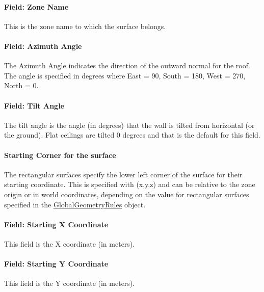 \paragraph{Field: Zone Name}\label{field-zone-name-5-005}

This is the zone name to which the surface belongs.

\paragraph{Field: Azimuth Angle}\label{field-azimuth-angle-5}

The Azimuth Angle indicates the direction of the outward normal for the roof. The angle is specified in degrees where East = 90, South = 180, West = 270, North = 0.

\paragraph{Field: Tilt Angle}\label{field-tilt-angle-5}

The tilt angle is the angle (in degrees) that the wall is tilted from horizontal (or the ground). Flat ceilings are tilted 0 degrees and that is the default for this field.

\paragraph{Starting Corner for the surface}\label{starting-corner-for-the-surface-5}

The rectangular surfaces specify the lower left corner of the surface for their starting coordinate. This is specified with (x,y,z) and can be relative to the zone origin or in world coordinates, depending on the value for rectangular surfaces specified in the \hyperref[globalgeometryrules]{GlobalGeometryRules} object.

\paragraph{Field: Starting X Coordinate}\label{field-starting-x-coordinate-5}

This field is the X coordinate (in meters).

\paragraph{Field: Starting Y Coordinate}\label{field-starting-y-coordinate-5}

This field is the Y coordinate (in meters).

